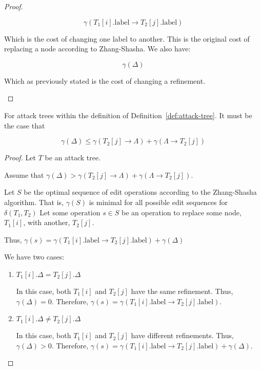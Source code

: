 \begin{lemma}
\begin{proof}
\begin{enumerate}
$$\gamma({T_1[i].\text{label}} \rightarrow {T_2[j].\text{label}})$$

Which is the cost of changing one label to another. This is the original cost of replacing a node according to Zhang-Shasha. We also have:

$$\gamma(\Delta)$$

Which as previously stated is the cost of changing a refinement.



\end{enumerate}

\end{proof}

\end{lemma}




\begin{lemma}\label{lem:gamma-delta-2}
For attack trees within the definition of Definition~\ref{def:attack-tree}. It must be the case that

\[\gamma(\Delta) \le \gamma(T_2[j] \rightarrow {\Lambda}) + \gamma(\Lambda \rightarrow {T_2[j]})\]

\begin{proof}
Let $T$ be an attack tree.

Assume that $\gamma(\Delta) > \gamma(T_2[j] \rightarrow {\Lambda}) + \gamma(\Lambda \rightarrow {T_2[j]})$.

Let $S$ be the optimal sequence of edit operations according to the Zhang-Shasha algorithm. That is, $\gamma(S)$ is minimal for all possible edit sequences for $\delta(T_1, T_2)$ Let some operation $s \in S$ be an operation to replace some node, $T_1[i]$, with another, $T_2[j]$.

Thus, $\gamma(s) = \gamma({T_1[i].\text{label}} \rightarrow {T_2[j].\text{label}}) + \gamma(\Delta)$

We have two cases:

\begin{enumerate}
\item $T_1[i].\Delta = T_2[j].\Delta$ 

In this case, both $T_1[i]$ and $T_2[j]$ have the same refinement. Thus, $\gamma(\Delta) = 0$. Therefore, $\gamma(s) = \gamma({T_1[i].\text{label}} \rightarrow {T_2[j].\text{label}})$. 

\item $T_1[i].\Delta \ne T_2[j].\Delta$

In this case, both $T_1[i]$ and $T_2[j]$ have different refinements. Thus, $\gamma(\Delta) > 0$. Therefore, $\gamma(s) = \gamma({T_1[i].\text{label}} \rightarrow {T_2[j].\text{label}}) + \gamma(\Delta)$.


\end{enumerate}
\end{proof}
\end{lemma}
